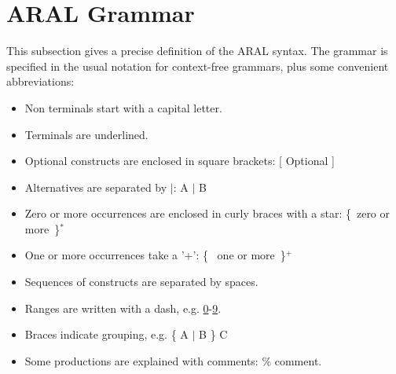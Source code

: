 \section{ARAL Grammar}

{
\newcommand{\regexstar}[1]{\{~#1~\}$^*$}
\newcommand{\regexplus}[1]{\{~#1~\}$^+$}
\newcommand{\regexgroup}[1]{\{~#1~\}}
\newcommand{\regexopt}[1]{[~#1~]}
\newcommand{\lexrange}[2]{\underline{#1}-\underline{#2}}
\newcommand{\lb}[0]{\underline{(}~}
\newcommand{\rb}[0]{\underline{)}}
\newcommand{\comma}[0]{\underline{,}~}
\newcommand{\garrow}[0]{$\rightarrow$}

\newenvironment{GRAMMAR}                          %
{
\begin{minipage}[t]{40ex}%
\prologcode\progfont%
\begin{quote}%
\begin{tabbing}%
\hspace{3ex}\=\hspace{3ex}\=\hspace{3ex}\=\hspace{3ex}%
\=\hspace{3ex}\=\hspace{4ex}\=\hspace{3ex}\=\hspace{3ex}\=\hspace{3ex}\=\hspace{3ex}\=\hspace{3ex}\=\hspace{3ex}\=\hspace{3ex}\kill}%
{\end{tabbing}%
\end{quote}%
\end{minipage}%
}

This subsection gives a precise definition of the ARAL syntax. The
grammar is specified in the usual notation for context-free grammars,
plus some convenient abbreviations:

\begin{itemize}
\item Non terminals start with a capital letter.
\item Terminals are underlined.
\item Optional constructs are enclosed in square brackets: [ Optional ]
\item Alternatives are separated by $\mid$: A $\mid$ B
\item Zero or more occurrences are enclosed in curly braces with a star: \regexstar{zero or more}
\item One or more occurrences take a '+': \regexplus{ one or more}
\item Sequences of constructs are separated by spaces.
\item Ranges are written with a dash, e.g. \underline{0}-\underline{9}.
\item Braces indicate grouping, e.g. \{ A $\mid$ B \} C
\item Some productions are explained with comments: \% comment.
\end{itemize}

}
